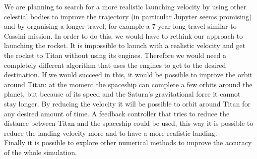 \documentclass[10pt,a4paper]{article}
\begin{document}
	We are planning to search for a more realistic launching velocity by using other celestial bodies to improve the trajectory (in particular Jupyter seems promising) and by organising a longer travel, for example a 7-year-long travel similar to Cassini mission. In order to do this, we would have to rethink our approach to launching the rocket. It is impossible to launch with a realistic velocity and get the rocket to Titan without using its engines. Therefore we would need a completely different algorithm that uses the engines to get to the desired destination.
	If we would succeed in this, it would be possible to improve the orbit around Titan: at the moment the spaceship can complete a few orbits around the planet, but because of its speed and the Saturn's gravitational force it cannot stay longer. By reducing the velocity it will be possible to orbit around Titan for any desired amount of time.
	A feedback controller that tries to reduce the distance between Titan and the spaceship could be used, this way it is possible to reduce the landing velocity more and to have a more realistic landing.\\
	Finally it is possible to explore other numerical methods to improve the accuracy of the whole simulation.
	
	\newpage
	
\end{document}
